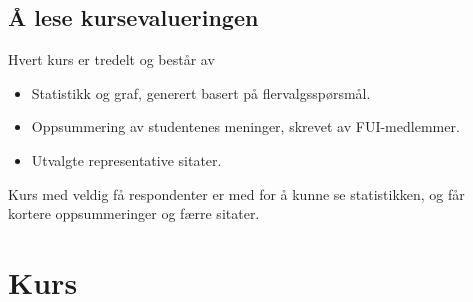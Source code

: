 \documentclass[norsk,a4paper,11pt]{report}
\begin{document}
\section{Å lese kursevalueringen}
Hvert kurs er tredelt og består av
\begin{itemize}
    \item Statistikk og graf, generert basert på flervalgsspørsmål.
    \item Oppsummering av studentenes meninger, skrevet av FUI-medlemmer.
    \item Utvalgte representative sitater.
\end{itemize}
Kurs med veldig få respondenter er med for å kunne se statistikken, og får kortere oppsummeringer og færre sitater.

\newpage
\chapter{Kurs}
\label{chp:courses}
\newpage
\end{document}
